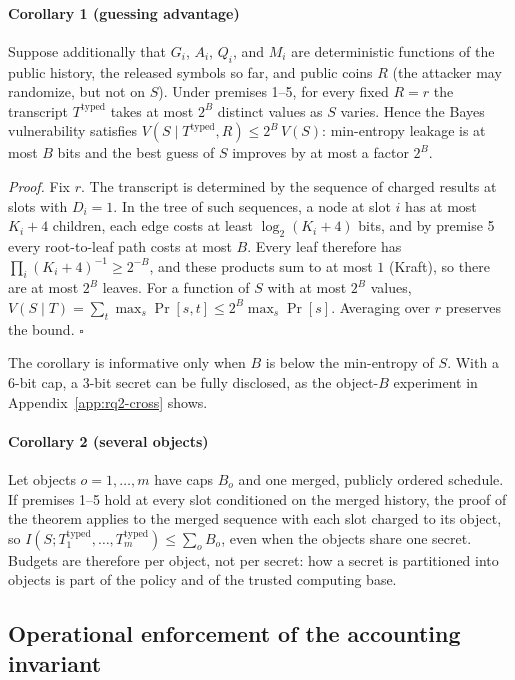 \documentclass[conference,compsoc]{IEEEtran}
\newcommand{\rev}[1]{#1} %
\begin{document}
{\rev{\paragraph{Corollary 1 (guessing advantage)} Suppose additionally that $G_i$, $A_i$, $Q_i$, and $M_i$ are deterministic functions of the public history, the released symbols so far, and public coins $R$ (the attacker may randomize, but not on $S$). Under premises 1--5, for every fixed $R=r$ the transcript $T^{\mathrm{typed}}$ takes at most $2^{B}$ distinct values as $S$ varies. Hence the Bayes vulnerability satisfies $V(S\mid T^{\mathrm{typed}},R)\le 2^{B}\,V(S)$: min-entropy leakage is at most $B$ bits and the best guess of $S$ improves by at most a factor $2^{B}$.

\emph{Proof.} Fix $r$. The transcript is determined by the sequence of charged results at slots with $D_i=1$. In the tree of such sequences, a node at slot $i$ has at most $K_i+4$ children, each edge costs at least $\log_2(K_i+4)$ bits, and by premise 5 every root-to-leaf path costs at most $B$. Every leaf therefore has $\prod_i (K_i+4)^{-1}\ge 2^{-B}$, and these products sum to at most $1$ (Kraft), so there are at most $2^{B}$ leaves. For a function of $S$ with at most $2^{B}$ values, $V(S\mid T)=\sum_t\max_s\Pr[s,t]\le 2^{B}\max_s\Pr[s]$. Averaging over $r$ preserves the bound. \hfill$\square$

The corollary is informative only when $B$ is below the min-entropy of $S$. With a 6-bit cap, a 3-bit secret can be fully disclosed, as the object-$B$ experiment in Appendix~\ref{app:rq2-cross} shows.

\paragraph{Corollary 2 (several objects)} Let objects $o=1,\dots,m$ have caps $B_o$ and one merged, publicly ordered schedule. If premises 1--5 hold at every slot conditioned on the merged history, the proof of the theorem applies to the merged sequence with each slot charged to its object, so $I(S;T^{\mathrm{typed}}_1,\dots,T^{\mathrm{typed}}_m)\le\sum_{o}B_o$, even when the objects share one secret. Budgets are therefore per object, not per secret: how a secret is partitioned into objects is part of the policy and of the trusted computing base.}

\subsection{Operational enforcement of the accounting invariant}
\label{sec:accounting-enforcement}
\label{app:pseudocode}

}
\end{document}

